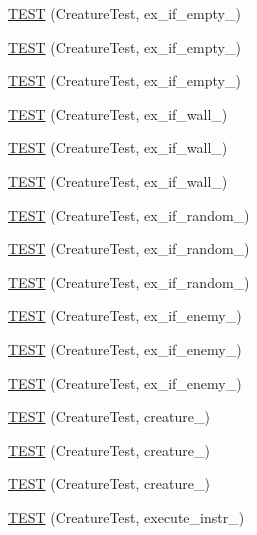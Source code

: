 \begin{DoxyCompactItemize}
\hyperlink{TestDarwin_8c_09_09_ab74dfeb47177fb2ac3ee3133dc2e4114}{T\-E\-S\-T} (Creature\-Test, ex\-\_\-if\-\_\-empty\-\_)
\item 
\hyperlink{TestDarwin_8c_09_09_a95f36a130ae85133f811013c7dba497a}{T\-E\-S\-T} (Creature\-Test, ex\-\_\-if\-\_\-empty\-\_)
\item 
\hyperlink{TestDarwin_8c_09_09_a733b2b6ef58892f1928e4f32cf9f6bf2}{T\-E\-S\-T} (Creature\-Test, ex\-\_\-if\-\_\-empty\-\_)
\item 
\hyperlink{TestDarwin_8c_09_09_a2c7f339b5eb3c1bdaed0889dc0538e8a}{T\-E\-S\-T} (Creature\-Test, ex\-\_\-if\-\_\-wall\-\_)
\item 
\hyperlink{TestDarwin_8c_09_09_a1e13dbf3b63e227c3452db648806ab2b}{T\-E\-S\-T} (Creature\-Test, ex\-\_\-if\-\_\-wall\-\_)
\item 
\hyperlink{TestDarwin_8c_09_09_af41a1bd24f01ca92c87b0f1864fba35b}{T\-E\-S\-T} (Creature\-Test, ex\-\_\-if\-\_\-wall\-\_)
\item 
\hyperlink{TestDarwin_8c_09_09_a5ee083c18a7a411ab7ea00153ea37ff0}{T\-E\-S\-T} (Creature\-Test, ex\-\_\-if\-\_\-random\-\_)
\item 
\hyperlink{TestDarwin_8c_09_09_a6e60454c886104a2456023e5d638ae17}{T\-E\-S\-T} (Creature\-Test, ex\-\_\-if\-\_\-random\-\_)
\item 
\hyperlink{TestDarwin_8c_09_09_a69f2b2668e1575e3e143e3224960cf25}{T\-E\-S\-T} (Creature\-Test, ex\-\_\-if\-\_\-random\-\_)
\item 
\hyperlink{TestDarwin_8c_09_09_a7c4b7127cbb14aee024375c65a41a074}{T\-E\-S\-T} (Creature\-Test, ex\-\_\-if\-\_\-enemy\-\_)
\item 
\hyperlink{TestDarwin_8c_09_09_a7c376bd61e51ccf47d2af52f1dd59d8e}{T\-E\-S\-T} (Creature\-Test, ex\-\_\-if\-\_\-enemy\-\_)
\item 
\hyperlink{TestDarwin_8c_09_09_ad9f0625f8546e3dbbc2708d53d1840d5}{T\-E\-S\-T} (Creature\-Test, ex\-\_\-if\-\_\-enemy\-\_)
\item 
\hyperlink{TestDarwin_8c_09_09_a47262622a975d247dd2c32a1d9afd6cb}{T\-E\-S\-T} (Creature\-Test, creature\-\_)
\item 
\hyperlink{TestDarwin_8c_09_09_a97223037211c6d5d3741301935dc5c32}{T\-E\-S\-T} (Creature\-Test, creature\-\_)
\item 
\hyperlink{TestDarwin_8c_09_09_ab0469122610fc6adb30674ec2352ac4a}{T\-E\-S\-T} (Creature\-Test, creature\-\_)
\item 
\hyperlink{TestDarwin_8c_09_09_a58ad3bf4e39a19ffdc92b1292271bf22}{T\-E\-S\-T} (Creature\-Test, execute\-\_\-instr\-\_)

\end{DoxyCompactItemize}
